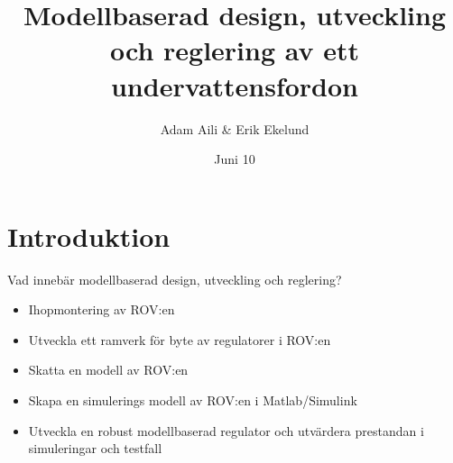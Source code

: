 \documentclass[11pt,aspectratio=169]{beamer}
\author{Adam Aili \& Erik Ekelund}
\title{Modellbaserad design, utveckling och reglering av ett undervattensfordon}
\date{Juni 10}
\begin{document}
\begin{frame}
\titlepage
\end{frame}
\section{Introduktion}
\begin{frame}
\begin{center}
Vad innebär modellbaserad design, utveckling och reglering?
\end{center}

\end{frame}

\begin{frame}
\begin{itemize}
\item Ihopmontering av ROV:en
\item Utveckla ett ramverk för byte av regulatorer i ROV:en
\item Skatta en modell av ROV:en
\item Skapa en simulerings modell av ROV:en i Matlab/Simulink
\item Utveckla en robust modellbaserad regulator och utvärdera prestandan i simuleringar och testfall
\end{itemize}
\end{frame}


\end{document}
